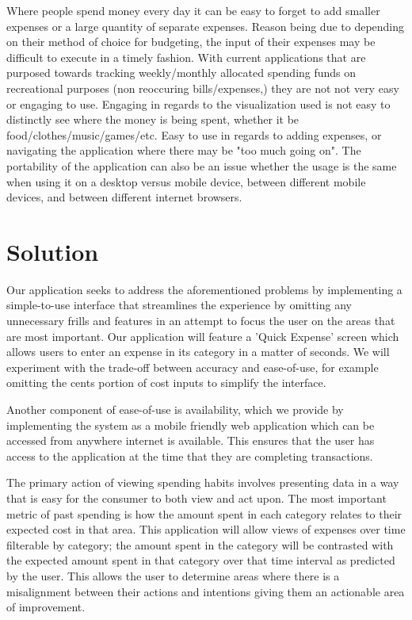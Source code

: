 \documentclass{chi2011}
\begin{document}
Where people spend money every day it can be easy to forget to add smaller expenses or a large quantity of separate 
expenses. Reason being due to depending on their method of choice for budgeting, the input of their expenses may be 
difficult to execute in a timely fashion. With current applications that are purposed towards tracking 
weekly/monthly allocated spending funds on recreational purposes (non reoccuring bills/expenses,) they are not not 
very easy or engaging to use. Engaging in regards to the visualization used is not easy to distinctly see where the 
money is being spent, whether it be food/clothes/music/games/etc. Easy to use in regards to adding expenses, or navigating 
the application where there may be "too much going on". The portability of the application can also be an issue whether the 
usage is the same when using it on a desktop versus mobile device, between different mobile devices, and between different 
internet browsers. 

\section{Solution}

Our application seeks to address the aforementioned problems by implementing a
simple-to-use interface that streamlines the experience by omitting any
unnecessary frills and features in an attempt to focus the user on the areas
that are most important. Our application will feature a 'Quick Expense' screen
which allows users to enter an expense in its category in a matter of seconds.
We will experiment with the trade-off between accuracy and ease-of-use, for
example omitting the cents portion of cost inputs to simplify the interface.

Another component of ease-of-use is availability, which
we provide by implementing the system as a mobile friendly web application which
can be accessed from anywhere internet is available. This ensures that the user 
has access to the application at the time that they are completing transactions.

The primary action of viewing spending habits involves presenting data in a way
that is easy for the consumer to both view and act upon. The most important
metric of past spending is how the amount spent in each category relates to
their expected cost in that area. This application will allow views of expenses
over time filterable by category; the amount spent in the category will be
contrasted with the expected amount spent in that category over that time
interval as predicted by the user. This allows the user to determine areas where
there is a misalignment between their actions and intentions giving them an
actionable area of improvement.
\end{document}
